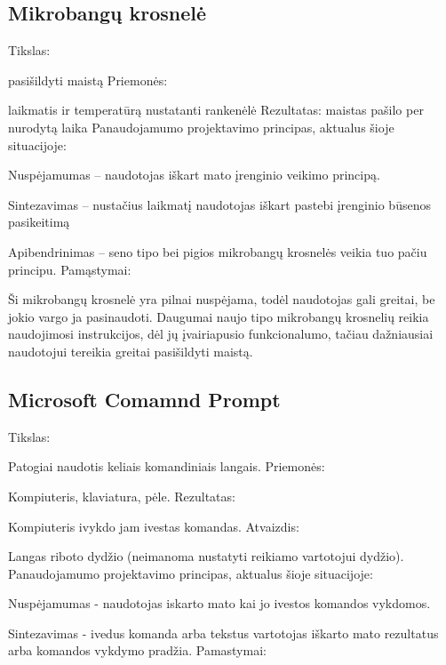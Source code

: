﻿\documentclass[a4paper, 12pt]{article}
\begin{document}
	\subsection{Mikrobangų krosnelė}
		Tikslas:
		
		pasišildyti maistą\newline 	
		Priemonės: 
		
		laikmatis ir temperatūrą nustatanti rankenėlė\newline 		
		Rezultatas:
		maistas pašilo per nurodytą laika\newline 	
		Panaudojamumo projektavimo principas, aktualus šioje situacijoje:
		
		Nuspėjamumas – naudotojas iškart mato įrenginio veikimo principą.
			
		Sintezavimas – nustačius laikmatį naudotojas iškart pastebi įrenginio būsenos pasikeitimą
			
		Apibendrinimas – seno tipo bei pigios mikrobangų krosnelės veikia tuo pačiu principu.\newline
		Pamąstymai:
			
		Ši mikrobangų krosnelė yra pilnai nuspėjama, todėl naudotojas gali greitai, be jokio vargo ja pasinaudoti. Daugumai naujo tipo mikrobangų krosnelių reikia naudojimosi instrukcijos, dėl jų įvairiapusio funkcionalumo, tačiau dažniausiai naudotojui tereikia greitai pasišildyti maistą.	
	\subsection{Microsoft Comamnd Prompt}
		Tikslas:
		
		Patogiai naudotis keliais komandiniais langais.\newline
		Priemonės:
		
		Kompiuteris, klaviatura, pėle.\newline
		Rezultatas:
		
		Kompiuteris ivykdo jam ivestas komandas.\newline	
		Atvaizdis:
		
		Langas riboto dydžio (neimanoma nustatyti reikiamo vartotojui dydžio).\newline	
		Panaudojamumo projektavimo principas, aktualus šioje situacijoje:
		
		Nuspėjamumas - naudotojas iskarto mato kai jo ivestos komandos vykdomos.
		
		Sintezavimas - ivedus komanda arba tekstus vartotojas iškarto mato rezultatus arba komandos vykdymo pradžia.\newline		
		Pamastymai:
		
\end{document}
